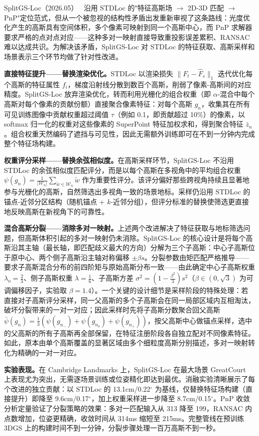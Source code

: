 SplitGS-Loc（2026.05）~\cite{2605_07351} 沿用 STDLoc 的"特征高斯场 $\to$ 2D-3D 匹配 $\to$ PnP"定位范式，但从一个被忽视的结构性矛盾出发重新审视了这条路线：光度优化产生的高斯具有空间体积，多个像素可映射到同一个高斯中心，而 PnP 求解器要求严格的点对点对应——这种多对一映射直接导致重投影误差累积、RANSAC 难以达成共识。为解决该矛盾，SplitGS-Loc 对 STDLoc 的特征获取、高斯采样和场景表示三个环节均做了针对性改进。

\textbf{直接特征提升——替换渲染优化。}STDLoc 以渲染损失 $\|F_t - \hat{F}_s\|_1$ 迭代优化每个高斯的特征属性 $f_i$，梯度沿射线分散到数百个高斯，削弱了像素-高斯间的对应精度。SplitGS-Loc 放弃渲染优化，转而利用光栅化的组合权重（即 $\alpha$-混合中每个高斯对每个像素的贡献份额）直接聚合像素特征：对每个高斯 $g_n$，收集其在所有可见训练图像中贡献权重超过阈值 $\tau$（例如 0.1，即贡献超过 10\%）的像素，以 softmax 归一化的权重对这些像素的 SuperPoint 特征加权求和，得到聚合特征 $\bar{z}_n$。组合权重天然编码了遮挡与可见性，因此无需额外训练即可在不到一分钟内完成整个特征场构建。

\textbf{权重评分采样——替换余弦相似度。}在高斯采样环节，SplitGS-Loc 不沿用 STDLoc 的余弦相似度匹配评分，而是以每个高斯在多视角中的平均组合权重 $\psi(g_n) = \frac{1}{|\mathcal{W}_n|}\sum_{\tilde{w}\in\mathcal{W}_n}\tilde{w}$ 作为重要性评分。该评分偏好那些跨视角持续且显著地参与光栅化的高斯，自然筛选出多视角一致的场景地标。采样仍沿用 STDLoc 的锚点-近邻分区结构（随机锚点 + $k$-近邻分组），但评分标准的替换使筛选更直接地反映高斯在新视角下的可靠性。

\textbf{混合高斯分裂——消除多对一映射。}上述两个改进解决了特征获取与地标筛选问题，但高斯体积引起的多对一映射仍未消除。SplitGS-Loc 的核心设计是将每个高斯沿其主轴（最长轴，即匹配歧义最大的方向）分解为三个子高斯：中心子高斯位于原中心、两个侧子高斯沿主轴对称偏移 $\pm\beta s$。分裂参数由矩匹配严格推导——要求子高斯混合分布的前四阶矩与原始高斯分布一致——由此确定中心子高斯权重 $\lambda_\text{o}=\frac{2}{3}$、侧子高斯权重 $\lambda=\frac{1}{6}$、子高斯方差 $\sigma^2 = (1-\frac{\beta^2}{3})s^2$（$\beta \in (0, \sqrt{3})$ 为可调偏移因子，实验取 $\beta=1.4$）。一个关键的设计细节是采样阶段的特殊处理：若直接对子高斯评分采样，同一父高斯的多个子高斯会在同一局部区域内互相淘汰，破坏分裂带来的一对一对应；因此采样时先将子高斯分数聚合回父高斯 $\bar{\psi}(g_n) = \frac{1}{3}(\psi(g_{n_-})+\psi(g_{n_o})+\psi(g_{n_+}))$，按父高斯中心做锚点采样，选中的父高斯的所有子高斯再全部保留，在特征注册阶段各自独立配对不同像素特征。如此，原本由单个高斯覆盖的显著区域由多个细粒度高斯分别描述，多对一映射转化为精确的一对一对应。

\textbf{实验表现。}在 Cambridge Landmarks 上，SplitGS-Loc 在最大场景 GreatCourt 上表现尤为突出，无需逐场景训练或位姿精化即达到最优。消融实验清晰展示了每个改进的独立贡献：以 STDLoc 的 13.1cm/0.22$^\circ$ 为基线，仅替换特征场构建（直接提升）即降至 9.6cm/0.17$^\circ$，加上权重采样进一步降至 8.7cm/0.15$^\circ$。PnP 收敛分析定量验证了分裂策略的效果：多对一匹配输入从 313 降至 199，RANSAC 内点数增加，位姿更精确，收敛时间从 314ms 缩短至 215ms。完整管线在预训练 3DGS 上的构建时间不到一分钟，分裂步骤处理一百万高斯不到一秒。


